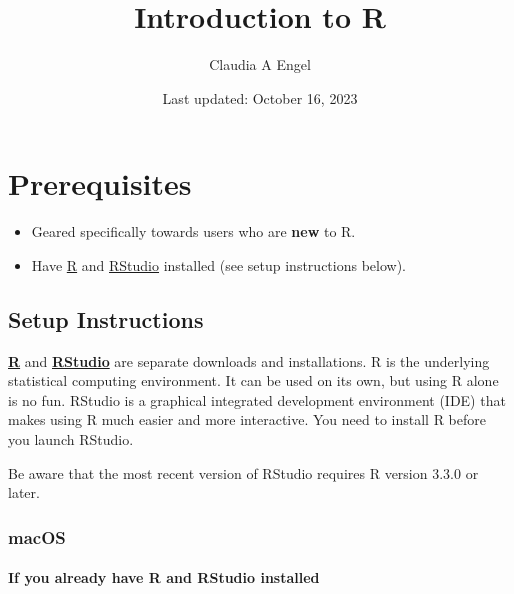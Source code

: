 \documentclass[
]{book}
\title{Introduction to R}
\author{Claudia A Engel}
\date{Last updated: October 16, 2023}
\providecommand{\tightlist}{%
  \setlength{\itemsep}{0pt}\setlength{\parskip}{0pt}}
\begin{document}
\maketitle

{
\setcounter{tocdepth}{1}
\tableofcontents
}
\hypertarget{prerequisites}{%
\chapter*{Prerequisites}\label{prerequisites}}

\begin{itemize}
\tightlist
\item
  Geared specifically towards users who are \textbf{new} to R.\\
\item
  Have \href{https://cran.r-project.org/}{R} and \href{https://posit.co/download/rstudio-desktop/}{RStudio} installed (see setup instructions below).
\end{itemize}

\hypertarget{setup-instructions}{%
\section*{Setup Instructions}\label{setup-instructions}}

\href{https://cran.r-project.org/}{\textbf{R}} and \href{https://posit.co/download/rstudio-desktop/}{\textbf{RStudio}} are separate downloads and installations. R is the
underlying statistical computing environment. It can be used on its own, but using R alone is no fun. RStudio is a graphical integrated development environment (IDE) that makes using R much easier and more interactive. You need to install R before you launch RStudio.

Be aware that the most recent version of RStudio requires R version 3.3.0 or later.

\hypertarget{macos}{%
\subsection*{macOS}\label{macos}}

\hypertarget{if-you-already-have-r-and-rstudio-installed}{%
\subsubsection*{If you already have R and RStudio installed}\label{if-you-already-have-r-and-rstudio-installed}}
\end{document}
